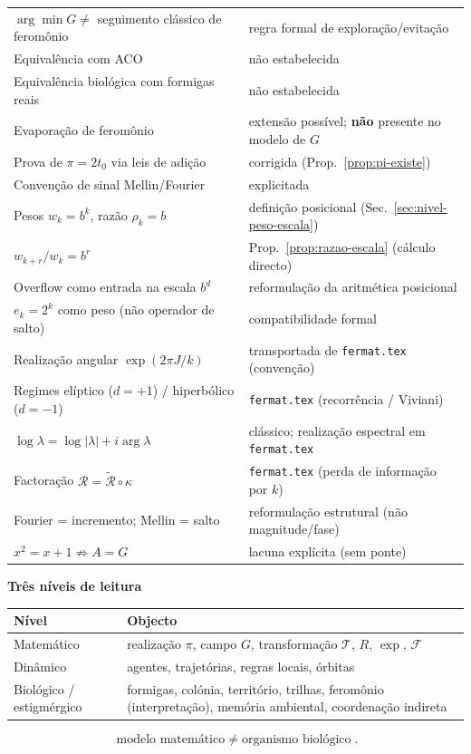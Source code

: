 \documentclass[11pt,a4paper]{article}
\begin{document}
\begin{center}
\begin{tabular}{@{}p{}p{}@{}}
\(\arg\min G\neq\) seguimento clássico de feromônio & regra formal de exploração/evitação \\
Equivalência com ACO & não estabelecida \\
Equivalência biológica com formigas reais & não estabelecida \\
Evaporação de feromônio & extensão possível; \textbf{não} presente no modelo de \(G\) \\
Prova de \(\pi=2t_0\) via leis de adição & corrigida (Prop.~\ref{prop:pi-existe}) \\
Convenção de sinal Mellin/Fourier & explicitada \\
Pesos \(w_k=b^k\), razão \(\rho_k=b\) & definição posicional (Sec.~\ref{sec:nivel-peso-escala}) \\
\(w_{k+r}/w_k=b^r\) & Prop.~\ref{prop:razao-escala} (cálculo directo) \\
Overflow como entrada na escala \(b^d\) & reformulação da aritmética posicional \\
\(e_k=2^k\) como peso (não operador de salto) & compatibilidade formal \\
Realização angular \(\exp(2\pi J/k)\) & transportada de \texttt{fermat.tex} (convenção) \\
Regimes elíptico (\(d=+1\)) / hiperbólico (\(d=-1\)) & \texttt{fermat.tex} (recorrência / Viviani) \\
\(\log\lambda=\log\lvert\lambda\rvert+i\arg\lambda\) & clássico; realização espectral em \texttt{fermat.tex} \\
Factoração \(\mathcal R=\widetilde{\mathcal R}\circ\kappa\) & \texttt{fermat.tex} (perda de informação por \(k\)) \\
Fourier = incremento; Mellin = salto & reformulação estrutural (não magnitude/fase) \\
\(x^2=x+1\not\Rightarrow A=G\) & lacuna explícita (sem ponte) \\
\bottomrule
\end{tabular}
\end{center}

\begin{center}
\small
\textbf{Três níveis de leitura}
\begin{tabular}{@{}p{}p{}@{}}
\toprule
Nível & Objecto \\
\midrule
Matemático & realização \(\pi\), campo \(G\), transformação \(\mathcal T\), \(R\), \(\exp\), \(\mathcal F\) \\
Dinâmico & agentes, trajetórias, regras locais, órbitas \\
Biológico / estigmérgico & formigas, colónia, território, trilhas, feromônio (interpretação), memória ambiental, coordenação indireta \\
\bottomrule
\end{tabular}
\end{center}

\[
\boxed{\text{modelo matemático}\;\neq\;\text{organismo biológico}}.
\]
\end{document}
